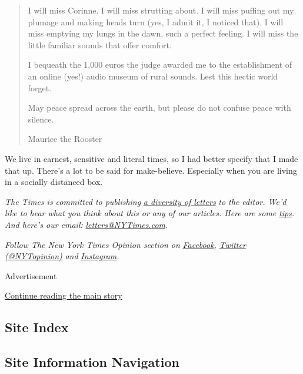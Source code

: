 \begin{quote}
I will miss Corinne. I will miss strutting about. I will miss puffing
out my plumage and making heads turn (yes, I admit it, I noticed that).
I will miss emptying my lungs in the dawn, such a perfect feeling. I
will miss the little familiar sounds that offer comfort.

I bequeath the 1,000 euros the judge awarded me to the establishment of
an online (yes!) audio museum of rural sounds. Lest this hectic world
forget.

May peace spread across the earth, but please do not confuse peace with
silence.

Maurice the Rooster
\end{quote}

We live in earnest, sensitive and literal times, so I had better specify
that I made that up. There's a lot to be said for make-believe.
Especially when you are living in a socially distanced box.

\emph{The Times is committed to publishing}
\href{https://www.nytimes3xbfgragh.onion/2019/01/31/opinion/letters/letters-to-editor-new-york-times-women.html}{\emph{a
diversity of letters}} \emph{to the editor. We'd like to hear what you
think about this or any of our articles. Here are some}
\href{https://help.nytimes3xbfgragh.onion/hc/en-us/articles/115014925288-How-to-submit-a-letter-to-the-editor}{\emph{tips}}\emph{.
And here's our email:}
\href{mailto:letters@NYTimes.com}{\emph{letters@NYTimes.com}}\emph{.}

\emph{Follow The New York Times Opinion section on}
\href{https://www.facebookcorewwwi.onion/nytopinion}{\emph{Facebook}}\emph{,}
\href{http://twitter.com/NYTOpinion}{\emph{Twitter (@NYTopinion)}}
\emph{and}
\href{https://www.instagram.com/nytopinion/}{\emph{Instagram}}\emph{.}

Advertisement

\protect\hyperlink{after-bottom}{Continue reading the main story}

\hypertarget{site-index}{%
\subsection{Site Index}\label{site-index}}

\hypertarget{site-information-navigation}{%
\subsection{Site Information
Navigation}\label{site-information-navigation}}

